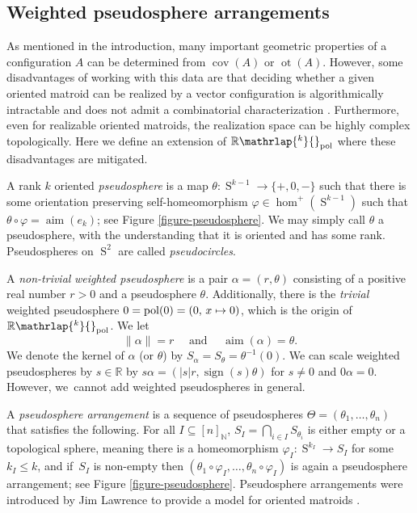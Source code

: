 \documentclass[JEP,XML,SOM,Unicode,NoFloatCountersInSection,published]{cedram}
\newcommand\mto{\mathchoice{\longmapsto}{\mapsto}{\mapsto}{\mapsto}}
\theoremstyle{remark}
\let\mb\mathbb
\let\df\emph
\let\phi\varphi
\DeclareMathOperator{\sign}{sign}
\DeclareMathOperator{\sphere}{S}
\newcommand{\Rpol}[1]{\mb{R}\mathrlap{{}^{#1}}{}_\text{pol}}
\DeclareMathOperator{\pol}{pol}
\DeclareMathOperator{\aim}{aim}
\DeclareMathOperator{\cov}{cov}
\DeclareMathOperator{\ot}{ot}
\begin{document}
\subsection{Weighted pseudosphere arrangements}\label{subsection-pseudosphere}

As mentioned in the introduction, many important geometric properties of a configuration $A$ can be determined from $\cov(A)$ or $\ot(A)$.
However, some disadvantages of working with this data are that deciding whether a given oriented matroid can be realized by a vector configuration is algorithmically intractable and does not admit a combinatorial characterization \cite{shor1991stretchability,vamos1978missing,mayhew2018yes}. Furthermore, even for realizable oriented matroids, the realization space can be highly complex topologically.
Here we define an extension of $\Rpol{k}$ where these disadvantages are mitigated.

A rank $k$ oriented \df{pseudosphere} is a map $\theta : \sphere^{k-1} \to \{+,0,-\}$ such that there is some orientation preserving self-homeomorphism $\phi \in \hom^+(\sphere^{k-1})$ such that \hbox{$\theta \circ \phi = \aim (e_k)$}; see Figure \ref{figure-pseudosphere}.
We may simply call $\theta$ a pseudosphere, with the understanding that it is oriented and has some rank.
Pseudospheres on $\sphere^2$ are called \df{pseudocircles}.

A \emph{non-trivial} \df{weighted pseudosphere} is a pair $\alpha = (r,\theta)$ consisting of a positive real number $r>0$ and a pseudosphere $\theta$. Additionally, there is the \emph{trivial} weighted pseudosphere $0 =\pol(0) = (0,\, x \mto 0)$, which is the origin of $\Rpol{k}$.
We let
\[\|\alpha\| = r \quad \text{ and } \quad \aim (\alpha) = \theta.\]
We denote the kernel of $\alpha$ (or $\theta$) by $S_\alpha = S_\theta = \theta^{-1}(0)$.
We can scale weighted pseudospheres by $s \in \mb{R}$ by $s \alpha = (|s|r,\sign(s)\theta)$ for $s\neq 0$ and $0\alpha = 0$.
However, we~cannot add weighted pseudospheres in general.

A \df{pseudosphere arrangement} is a sequence of pseudospheres $\Theta = (\theta_1,\dots,\theta_n)$ that satisfies the following.
For all $I \subseteq [n]_\mb{N}$,
$S_I = \bigcap_{i \in I} S_{\theta_i} $ is either empty or a topological sphere, meaning there is a homeomorphism $\phi_I : \sphere^{k_I} \to S_I$ for some $k_I \leq k$,
and if~$S_I$ is non-empty then $(\theta_1 \circ \phi_I,\dots, \theta_n \circ \phi_I)$ is again a pseudosphere arrangement; see Figure \ref{figure-pseudosphere}.
Pseudosphere arrangements were introduced by Jim Lawrence to provide a model for oriented matroids \cite{folkman1978oriented}.
\end{document}
